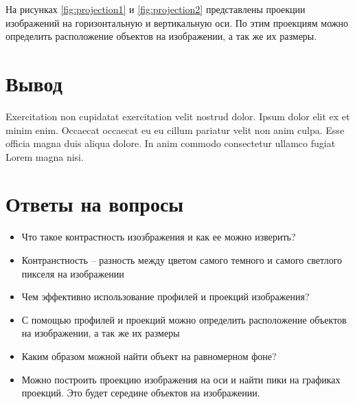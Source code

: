 \documentclass[a4paper, 12pt]{extarticle}
\begin{document}
На рисунках \ref{fig:projection1} и \ref{fig:projection2} представлены проекции изображений на горизонтальную и вертикальную оси. 
По этим проекциям можно определить расположение объектов на изображении, а так же их размеры.

\newpage\clearpage
\section{Вывод}

Exercitation non cupidatat exercitation velit nostrud dolor. Ipsum dolor elit ex et minim enim. Occaecat occaecat eu eu cillum pariatur velit non anim culpa. Esse officia magna duis aliqua dolore. In anim commodo consectetur ullamco fugiat Lorem magna nisi.

\section{Ответы на вопросы}

\setcounter{question}{0}

\newcommand{\question}[1]{\item[Q\refstepcounter{question}\thequestion.] #1}
\newcommand{\answer}[1]{\item[A\thequestion.] #1}

\begin{itemize}
  \question{Что такое контрастность изозбражения и как ее можно изверить?}
  \answer{Контранстность -- разность между цветом самого темного и самого светлого пикселя на изображении}

  \question{Чем эффективно использование профилей и проекций изображения?}
  \answer{С помощью профилей и проекций можно определить расположение объектов на изображении, а так же их размеры}

  \question{Каким образом можной найти объект на равномерном фоне?}
  \answer{Можно построить проекцию изображения на оси и найти пики на графиках проекций. Это будет середине объектов на изображении.}
\end{itemize}
\end{document}

